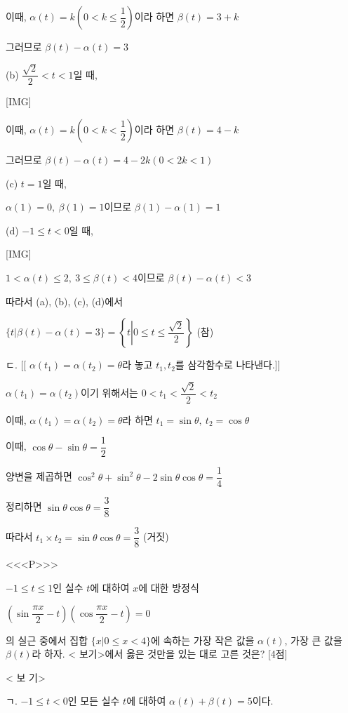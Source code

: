 \documentclass{oblivoir}
\begin{document}
이때, $\alpha(t)=k\left(0< k\le\dfrac{1}{2}\right)$이라 하면 $\beta(t)=3+k$

그러므로 $\beta(t)-\alpha(t)=3$

(b) $\dfrac{\sqrt{2}}{2}< t< 1$일 때,

[IMG]

이때, $\alpha(t)=k\left(0< k< \dfrac{1}{2}\right)$이라 하면 $\beta(t)=4-k$

그러므로 $\beta(t)-\alpha(t)=4-2k(0< 2k< 1)$

(c) $t=1$일 때,

$\alpha(1)=0,\:\beta(1)=1$이므로 $\beta(1)-\alpha(1)=1$

(d) $-1\le t< 0$일 때,

[IMG]

$1< \alpha(t)\le 2,\:3\le\beta(t)< 4$이므로 $\beta(t)-\alpha(t)< 3$

따라서 (a), (b), (c), (d)에서

$\{t \left| \beta(t)-\alpha(t)=3 \right. \}=\left\{t \left| 0\le t\le\dfrac{\sqrt{2}}{2} \right. \right\}$ (참)

ㄷ. [[ $\alpha\left(t_{1}\right)=\alpha\left(t_{2}\right)=\theta$라 놓고 $t_{1}, t_{2}$를 삼각함수로 나타낸다.]]

$\alpha\left(t_{1}\right)=\alpha\left(t_{2}\right)$이기 위해서는 $0< t_{1}< \dfrac{\sqrt{2}}{2}< t_{2}$

이때, $\alpha\left(t_{1}\right)=\alpha\left(t_{2}\right)=\theta$라 하면 $t_{1}=\sin\theta ,\:t_{2}=\cos\theta$

이때, $\cos\theta -\sin\theta =\dfrac{1}{2}$

양변을 제곱하면 $\cos^{2}\theta +\sin^{2}\theta -2\sin\theta\cos\theta =\dfrac{1}{4}$

정리하면 $\sin\theta\cos\theta =\dfrac{3}{8}$

따라서 $t_{1}\times t_{2}=\sin\theta\cos\theta =\dfrac{3}{8}$  (거짓)

<<<P>>>

$-1\le t\le 1$인 실수 $t$에 대하여 $x$에 대한 방정식

$\left(\sin\dfrac{\pi x}{2}-t\right)\left(\cos\dfrac{\pi x}{2}-t\right)=0$

의 실근 중에서 집합 $\{x | 0\le x < 4\}$에 속하는 가장 작은 값을 $\alpha(t)$, 가장 큰 값을 $\beta(t)$라 하자. < 보기>에서 옳은 것만을 있는 대로 고른 것은? [4점]

< 보 기>

ㄱ. $-1\le t < 0$인 모든 실수 $t$에 대하여 $\alpha(t)+\beta(t)=5$이다.
\end{document}
